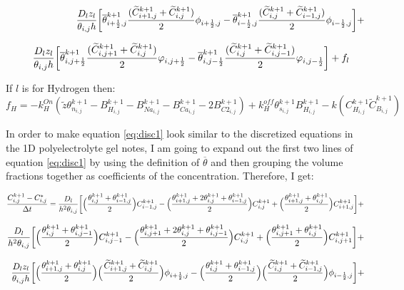 \documentclass[11pt,a4paper]{article}
\begin{document}
\begin{flushleft}
$\hspace{2.6cm}  \dfrac{D_l z_l}{\theta_{i,j} h}\bigg[ \overline{\theta}^{k+1}_{i+\frac{1}{2},j}\dfrac{(\widetilde C^{k+1}_{i+1,j}+\widetilde C^{k+1}_{i,j})}{2}\phi_{i+\frac{1}{2},j} -   \overline{\theta}^{k+1}_{i-\frac{1}{2},j}\dfrac{(\widetilde C^{k+1}_{i,j}+\widetilde C^{k+1}_{i-1,j})}{2}\phi_{i-\frac{1}{2},j}\bigg] +$

\begin{equation}
\hspace{0.40cm}\dfrac{D_l z_l}{ \theta_{i,j} h}\bigg[ \overline{\theta}^{k+1}_{i,j+\frac{1}{2}}\dfrac{(\widetilde C^{k+1}_{i,j+1}+\widetilde C^{k+1}_{i,j})}{2}\varphi_{i,j+\frac{1}{2}} -   \overline{\theta}^{k+1}_{i,j-\frac{1}{2}}\dfrac{(\widetilde C^{k+1}_{i,j}+\widetilde C^{k+1}_{i,j-1})}{2}\varphi_{i,j-\frac{1}{2}}\bigg] + f_l \label{eq:disc1}
\end{equation}

\bigskip If $l$ is for Hydrogen then: 
\begin{equation}
f_H = -k_H^{On} (\tilde z \theta_{n_{i,j}}^{k+1} - B_{H_{i,j}}^{k+1} -  B_{Na_{i,j}}^{k+1} - B_{Ca_{i,j}}^{k+1} -2B_{C2_{i,j}}^{k+1}) + k_H^{off}\theta^{k+1}_{s_{i,j}} B^{k+1}_{H_{i,j}} - k(C^{k+1}_{H_{i,j}}\widetilde C^{k+1}_{B_{i,j}})
\label{eq: fhy}
\end{equation}

\bigskip In order to make equation \ref{eq:disc1} look similar to the discretized equations in the 1D polyelectrolyte gel notes, I am going to expand out the first two lines of equation \ref{eq:disc1} by using the definition of $\overline\theta$ and then grouping the volume fractions together as coefficients of the concentration. Therefore, I get: 

\bigskip $\dfrac{C^{k+1}_{i,j}-C^*_{i,j}}{\Delta t} = \dfrac{D_l}{h^2 \theta_{i,j}}\bigg[\Big(\dfrac{\theta^{k+1}_{i,j}+ \theta^{k+1}_{i-1,j}}{2}\Big)C^{k+1}_{i-1,j} - \Big(\dfrac{\theta^{k+1}_{i+1,j}+ 2\theta^{k+1}_{i,j}+ \theta^{k+1}_{i-1,j}}{2}\Big)C^{k+1}_{i,j} + \Big(\dfrac{\theta^{k+1}_{i+1,j}+ \theta^{k+1}_{i,j}}{2}\Big)C^{k+1}_{i+1,j}\bigg]+ \medskip$

$\dfrac{D_l}{h^2 \theta_{i,j}}\bigg[\Big(\dfrac{\theta^{k+1}_{i,j}+ \theta^{k+1}_{i,j-1}}{2}\Big)C^{k+1}_{i,j-1} - \Big(\dfrac{\theta^{k+1}_{i,j+1}+ 2\theta^{k+1}_{i,j}+ \theta^{k+1}_{i,j-1}}{2}\Big)C^{k+1}_{i,j} + \Big(\dfrac{\theta^{k+1}_{i,j+1}+ \theta^{k+1}_{i,j}}{2}\Big)C^{k+1}_{i,j+1}\bigg]+ \medskip$

$\hspace{0.2cm} \dfrac{D_l z_l}{\theta_{i,j} h}\bigg[\Big(\dfrac{\theta^{k+1}_{i+1,j}+ \theta^{k+1}_{i,j}}{2}\Big)\Big(\dfrac{\widetilde C^{k+1}_{i+1,j}+\widetilde C^{k+1}_{i,j}}{2}\Big)\phi_{i+\frac{1}{2},j} - \Big(\dfrac{\theta^{k+1}_{i,j}+ \theta^{k+1}_{i-1,j}}{2}\Big)\Big(\dfrac{\widetilde C^{k+1}_{i,j}+\widetilde C^{k+1}_{i-1,j}}{2}\Big)\phi_{i-\frac{1}{2},j}\bigg] +$


\end{flushleft}
\end{document}

